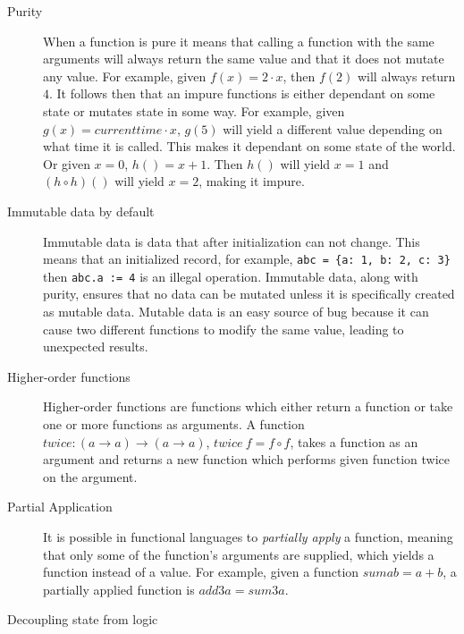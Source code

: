 \begin{description}
\item[ Purity ]

When a function is pure it means that calling a function with the same arguments
        will always return the same value and that it does not mutate any value.
        For example, given $f(x) = 2\cdot x$, then $f(2)$ will always
        return $4$. It follows then that an impure functions is either dependant
        on some state or mutates state in some way. For example, given $g(x) =
        currenttime \cdot x$, $g(5)$ will yield a different value depending on
        what time it is called. This makes it dependant on some state of the
        world. Or given $x=0$, $h()=x+1$. Then $h()$ will yield $x=1$ and $(h
        \circ h)()$ will yield $x=2$, making it impure.~\cite{wikipedia_pure}

\item[ Immutable data by default ]

Immutable data is data that after initialization can not change. This means that
an initialized record, for example, \texttt{abc = \{a: 1, b: 2, c: 3\}} then
\texttt{abc.a := 4} is an illegal operation. Immutable data, along with purity,
ensures that no data can be mutated unless it is specifically created as mutable
data.  Mutable data is an easy source of bug because it can cause two different
functions to modify the same value, leading to unexpected results.

\item[Higher-order functions]

	Higher-order functions are functions which either return a function or take
one or more functions as arguments. A function $twice : (a\rightarrow
a)\rightarrow (a\rightarrow a)$, $twice\ f = f \circ f$, takes a function as an
argument and returns a new function which performs given function twice on the
argument. 

\item[Partial Application] 
    It is possible in functional languages to \textit{partially apply} a
    function, meaning that only some of the function's arguments are supplied,
    which yields a function instead of a value. For example, given a function
    $sum a b = a + b$, a partially applied function is $add3 a = sum 3 a$. 

\item[Decoupling state from logic]


\end{description}
